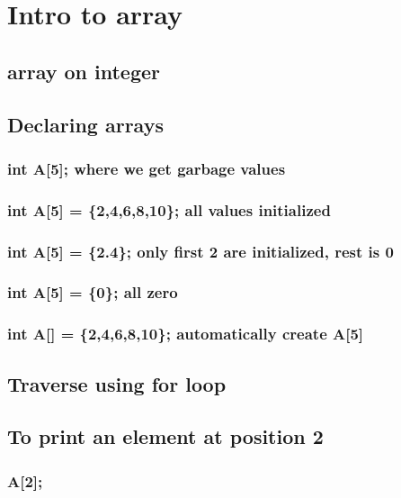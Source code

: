 \documentclass{article}
\date{\today}
\title{}
\begin{document}
\tableofcontents





\section{Intro to array}
\label{sec:org8a80096}
\subsection{array on integer}
\label{sec:org8172de6}
\subsection{Declaring arrays}
\label{sec:org21a09d5}
\subsubsection{int A[5];   where we get garbage values}
\label{sec:org90d8e5a}
\subsubsection{int A[5] = \{2,4,6,8,10\}; all values initialized}
\label{sec:org6c88856}
\subsubsection{int A[5] = \{2.4\}; only first 2 are initialized, rest is 0}
\label{sec:orgab3949b}
\subsubsection{int A[5] = \{0\}; all zero}
\label{sec:orgc9cd4fe}
\subsubsection{int A[] = \{2,4,6,8,10\}; automatically create A[5]}
\label{sec:orge7d6786}
\subsection{Traverse using for loop}
\label{sec:org9a06cad}
\subsection{To print an element at position 2}
\label{sec:org7e857bb}
\subsubsection{A[2];}
\label{sec:orgd8356c4}
\end{document}
